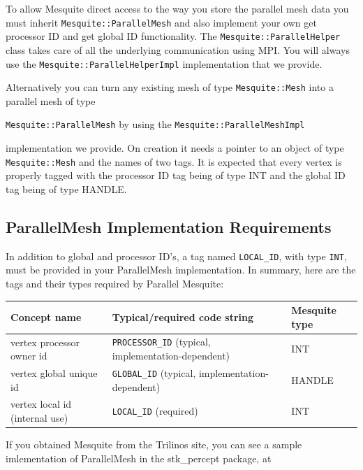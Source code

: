 To allow Mesquite direct access to the way you store the parallel mesh data you must inherit \texttt{Mesquite::ParallelMesh} and also implement your own get processor ID and get global ID functionality. The \texttt{Mesquite::ParallelHelper} class takes care of all the underlying communication using MPI. You will always use the \texttt{Mesquite::ParallelHelperImpl} implementation that we provide.

Alternatively you can turn any existing mesh of type \texttt{Mesquite::Mesh} into a parallel mesh of type\vspace{-5pt} \begin{center}
\texttt{Mesquite::ParallelMesh} by using the \texttt{Mesquite::ParallelMeshImpl}
\end{center} \vspace{-5 pt}implementation we provide. On creation it needs a pointer to an object of type \texttt{Mesquite::Mesh} and the names of two tags. It is expected that every vertex is properly tagged with the processor ID tag being of type INT and the global ID tag being of type HANDLE.


\subsection{ParallelMesh Implementation Requirements}

In addition to global and processor ID's, a tag named \texttt{LOCAL\_ID}, with type \texttt{INT}, must be provided in
your ParallelMesh implementation.  In summary, here are the tags and
their types required by Parallel Mesquite:

\begin{tabular}{ | l | l | l | }
  \hline
  Concept name & Typical/required code string &  Mesquite type \\
\hline
 vertex processor owner id & \texttt{PROCESSOR\_ID} (typical, implementation-dependent) & INT \\
 vertex global unique id & \texttt{GLOBAL\_ID} (typical,  implementation-dependent) & HANDLE \\
 vertex local id (internal use) & \texttt{LOCAL\_ID} (required) & INT \\
  \hline
\end{tabular}

If you obtained Mesquite from the Trilinos site, you can see a sample
imlementation of ParallelMesh in the stk\_percept package, at

